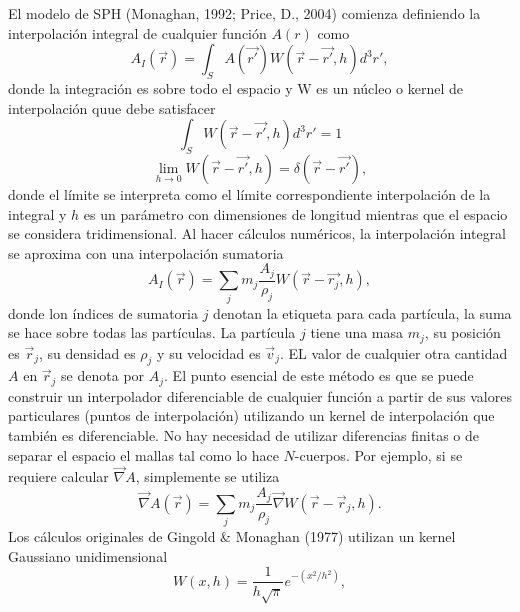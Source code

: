 \documentclass[a4paper,openright,12pt]{book}
\begin{document}
El modelo de SPH (Monaghan, 1992; Price, D., 2004) \cite{b8, b9} comienza definiendo la interpolación integral de cualquier función $A(r)$ como
\begin{equation}
 A_{I}(\vec{r})
 =
 \int_{S} 
 A(\vec{r'})W(\vec{r}- \vec{r'}, h)d^{3}r',\label{eqn2.16}
\end{equation} 
donde la integración es sobre todo el espacio y W es un núcleo o kernel de interpolación quue debe satisfacer
\begin{equation}
 \int_{S}W(\vec{r}- \vec{r'},h)d^{3}r' = 1\label{eqn2.17}
\end{equation}
\begin{equation}
\lim_{h \to 0} W(\vec{r}-\vec{r'},h) = \delta(\vec{r}-\vec{r'}),\label{eqn2.18}
\end{equation}
donde el límite se interpreta como el límite correspondiente interpolación de la integral y $h$ es un parámetro con dimensiones de longitud mientras que el espacio se considera tridimensional. 
Al hacer cálculos numéricos, la interpolación integral se aproxima con una interpolación sumatoria
\begin{equation}
 A_{I}(\vec{r})
 =
 \sum_{j} m_{j} \frac{A_{j}}{\rho_{j}} W(\vec{r}- \vec{r_{j}},h),\label{eqn2.19}
\end{equation}
donde lon índices de sumatoria $j$ denotan la etiqueta para cada partícula, la suma se hace sobre todas las partículas. La partícula $j$ tiene una masa $m_{j}$, su posición es $\vec{r}_{j}$, su densidad es $\rho_{j}$ y su velocidad es $\vec{v}_{j}$. EL valor de cualquier otra cantidad $A$ en $\vec{r}_{j}$ se denota por $A_{j}$. El punto esencial de este método es que se puede construir un interpolador diferenciable de cualquier función a partir de sus valores particulares (puntos de interpolación) utilizando un kernel de interpolación que también es diferenciable. No hay necesidad de utilizar diferencias finitas o de separar el espacio el mallas tal como lo hace $N$-cuerpos. Por ejemplo, si se requiere calcular $\vec{\nabla}A$, simplemente se utiliza
\begin{equation}
\vec{\nabla}A(\vec{r}) = 
\sum_{j} m_{j} \frac{A_{j}}{\rho_{j}} \vec{\nabla}W(\vec{r}-\vec{r}_{j}, h).\label{eqn 2.20}
\end{equation}
Los cálculos originales de Gingold \& Monaghan (1977) \cite{b9.1} utilizan un kernel Gaussiano unidimensional
\begin{equation}
  W(x,h)
  =
  \frac{1}{h \sqrt{\pi}} e^{-(x^{2}/h^{2})},\label{eqn2.21}
\end{equation}
\end{document}
